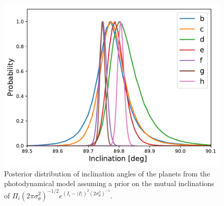 \documentclass[fleqn,usenatbib]{mnras} %
\begin{document}
\begin{figure}
    \centering
    \includegraphics[width=\hsize]{figures/inclination_nouprior_incprior.pdf}
    \caption{Posterior distribution of inclination angles of the planets from the photodynamical model assuming
    a prior on the mutual inclinations of $\Pi_i (2\pi\sigma_\theta^2)^{-1/2} e^{(I_i-\langle I\rangle)^2(2\sigma_\theta^2)^{-1}}$.}
    \label{fig:inclination_prior}
\end{figure}
\end{document}
